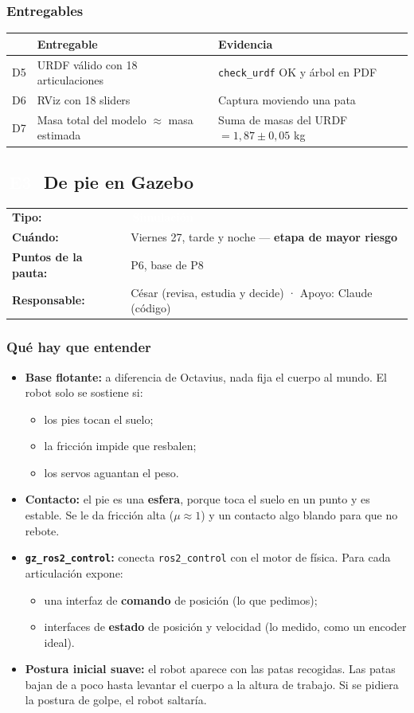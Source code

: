 \documentclass[11pt,a4paper]{article}
\makeatletter
\newcommand{\pill}[2]{{\setlength{\fboxsep}{1.6pt}\colorbox{#1}{\textcolor{white}{\footnotesize\bfseries\,#2\,}}}}
\newcommand{\Et}{\pill{cSim}{E3}}
\newcommand{\ficha}[4]{%
  \begin{tabularx}{\linewidth}{@{}l Y@{}}
  \textbf{Tipo:} & \pill{#1}{#2}\\
  \textbf{Cuándo:} & #3\\
  \textbf{Puntos de la pauta:} & #4\\
  \textbf{Responsable:} & César (revisa, estudia y decide) · Apoyo: Claude (código)\\
  \end{tabularx}\par}
\makeatother
\begin{document}
\subsubsection{Entregables}
\begin{tabularx}{\linewidth}{@{}l Y Y@{}}
\toprule \textbf{} & \textbf{Entregable} & \textbf{Evidencia}\\ \midrule
D5 & URDF válido con 18 articulaciones & \texttt{check\_urdf} OK y árbol en PDF\\
D6 & RViz con 18 sliders & Captura moviendo una pata\\
D7 & Masa total del modelo $\approx$ masa estimada & Suma de masas del URDF $= 1{,}87 \pm 0{,}05$ kg\\
\bottomrule
\end{tabularx}

\subsection{\texorpdfstring{\Et\ }{E3 }De pie en Gazebo}
\ficha{cSim}{Simulación}{Viernes 27, tarde y noche --- \textbf{etapa de mayor riesgo}}{P6, base de P8}

\subsubsection{Qué hay que entender}
\begin{itemize}
  \item \textbf{Base flotante:} a diferencia de Octavius, nada fija el cuerpo al mundo. El robot solo se sostiene si:
  \begin{itemize}
    \item los pies tocan el suelo;
    \item la fricción impide que resbalen;
    \item los servos aguantan el peso.
  \end{itemize}
  \item \textbf{Contacto:} el pie es una \textbf{esfera}, porque toca el suelo en un punto y es estable. Se le da fricción alta ($\mu \approx 1$) y un contacto algo blando para que no rebote.
  \item \textbf{\texttt{gz\_ros2\_control}:} conecta \texttt{ros2\_control} con el motor de física. Para cada articulación expone:
  \begin{itemize}
    \item una interfaz de \textbf{comando} de posición (lo que pedimos);
    \item interfaces de \textbf{estado} de posición y velocidad (lo medido, como un encoder ideal).
  \end{itemize}
  \item \textbf{Postura inicial suave:} el robot aparece con las patas recogidas. Las patas bajan de a poco hasta levantar el cuerpo a la altura de trabajo. Si se pidiera la postura de golpe, el robot saltaría.
\end{itemize}
\end{document}
